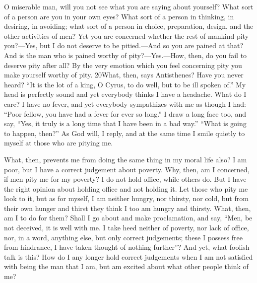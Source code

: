 O miserable man, will you not see what you are saying about yourself? What sort of a person are you in your own eyes? What sort of a person in thinking, in desiring, in avoiding; what sort of a person in choice, preparation, design, and the other activities of men? Yet you are concerned whether the rest of mankind pity you?—Yes, but I do not deserve to be pitied.—And so you are pained at that? And is the man who is pained worthy of pity?—Yes.—How, then, do you fail to deserve pity after all? By the very emotion which you feel concerning pity you make yourself worthy of pity. 20What, then, says Antisthenes? Have you never heard? ``It is the lot of a king, O Cyrus, to do well, but to be ill spoken of.'' My head is perfectly sound and yet everybody thinks I have a headache. What do I care? I have no fever, and yet everybody sympathizes with me as though I had: ``Poor fellow, you have had a fever for ever so long.'' I draw a long face too, and say, ``Yes, it truly is a long time that I have been in a bad way.'' ``What is going to happen, then?'' As God will, I reply, and at the same time I smile quietly to myself at those who are pitying me.

What, then, prevents me from doing the same thing in my moral life also? I am poor, but I have a correct judgement about poverty. Why, then, am I concerned, if men pity me for my poverty? I do not hold office, while others do. But I have the right opinion about holding office and not holding it. Let those who pity me look to it, but as for myself, I am neither hungry, nor thirsty, nor cold, but from their own hunger and thirst they think I too am hungry and thirsty. What, then, am I to do for them? Shall I go about and make proclamation, and say, ``Men, be not deceived, it is well with me. I take heed neither of poverty, nor lack of office, nor, in a word, anything else, but only correct judgements; these I possess free from hindrance, I have taken thought of nothing further''? And yet, what foolish talk is this? How do I any longer hold correct judgements when I am not satisfied with being the man that I am, but am excited about what other people think of me?

